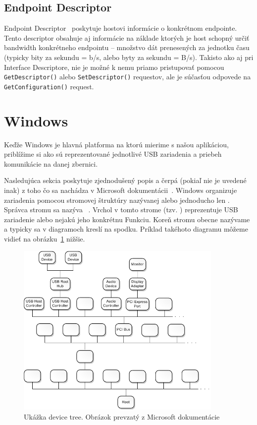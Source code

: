 \subsection*{Endpoint Descriptor}
Endpoint Descriptor~\cite{usb_chap9_end_desc} poskytuje hostovi informácie o konkrétnom endpointe. Tento descriptor obsahuje aj informácie na základe ktorých je host schopný určiť bandwidth konkrétneho endpointu -- množstvo dát prenesených za jednotku času (typicky bity za sekundu = b/s, alebo byty za sekundu = B/s). Takisto ako aj  pri Interface Descriptore, nie je možné k nemu priamo pristupovať pomocou \texttt{GetDescriptor()} alebo \texttt{SetDescriptor()} requestov, ale je súčasťou odpovede na \texttt{GetConfiguration()} request.

\section{Windows}
Keďže Windows je hlavná platforma na ktorú mierime s našou aplikáciou, priblížime si ako sú reprezentované jednotlivé USB zariadenia a priebeh komunikácie na danej zbernici.

Nasledujúca sekcia poskytuje zjednodušený popis a čerpá (pokiaľ nie je uvedené inak) z toho čo sa nachádza v Microsoft dokumentácii~\cite{usb_msdn_device_node_stack}.
Windows organizuje zariadenia pomocou stromovej štruktúry nazývanej  alebo jednoducho len . Správca stromu sa nazýva ~\cite{usb_msdn_pnp_manager}. Vrchol v tomto strome (tzv. ) reprezentuje USB zariadenie alebo nejakú jeho konkrétnu Funkciu. Koreň stromu obecne nazývame  a typicky sa v diagramoch kreslí na spodku. Príklad takéhoto diagramu môžeme vidieť na obrázku~\ref{obr:kap2:device_tree} nižšie.

\begin{figure}[!htb]
	\centering
	\includegraphics[width=10cm]{img/kap02_device_tree}
	\caption{Ukážka device tree. Obrázok prevzatý z Microsoft dokumentácie~\cite{usb_msdn_device_node_stack}}
	\label{obr:kap2:device_tree}
\end{figure}

